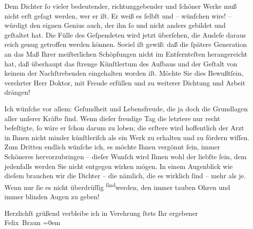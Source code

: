 \pstart
           {\pb}Dem Dichter ſo vieler bedeutender, richtunggebender
               und ſchöner Werke muß nicht erſt geſagt werden, wer er iſt. Er weiß es ſelbſt und –
               wünſchen wirs! – würdigt den eignen Genius auch, der ihn ſo und nicht anders gebildet
               und geſtaltet hat. Die Fülle des Geſpendeten wird jetzt überſehen, die Ausleſe daraus
               reich genug getroffen werden können. Soviel iſt gewiß: daß die ſpätere Generation an
               das Maß Ihrer meiſterlichen Schöpfungen nicht im Entfernteſten herangereicht hat, daß
               überhaupt das ſtrenge Künſtlertum des Aufbaus und der Geſtalt von keinem der
               Nachſtrebenden eingehalten worden iſt. Möchte Sie dies Bewußtſein, verehrter Herr
               Doktor, mit Freude erfüllen und zu weiterer Dichtung und Arbeit drängen!\pend
           
\pstart
           Ich wünſche vor allem: Geſundheit und Lebensfreude, die ja doch die Grundlagen aller
               unſerer Kräfte ſind. Wenn dieſer freudige {\pb}Tag die
               letztere nur recht befeſtigte, ſo wäre er ſchon darum zu loben; die erſtere wird
               hoffentlich der Arzt in Ihnen nicht minder künſtleriſch als ein Werk zu erhalten und
               zu fördern wiſſen. Zum Dritten endlich wünſche ich, es möchte Ihnen vergönnt ſein,
               immer Schöneres hervorzubringen – dieſer Wunſch wird Ihnen wohl der liebſte ſein, dem
               jedenfalls werden Sie nicht entgegen wirken mögen. In einem Augenblick wie dieſem
               brauchen wir die Dichter – die nämlich, die es wirklich ſind – mehr als je. Wenn nur
               ſie es nicht überdrüſſig \substVorne{}\textsuperscript{ſind}\substDazwischen{}werden\substHinten{}, den immer tauben Ohren und immer blinden Augen zu geben!\pend
           
\pstart
           Herzlichſt grüßend verbleibe ich in Verehrung ſtets Ihr ergebener{\\[\baselineskip]}\spacefill\mbox{Felix Braun}\pend
           \leftskip=0em{}\endnumbering{}  
      